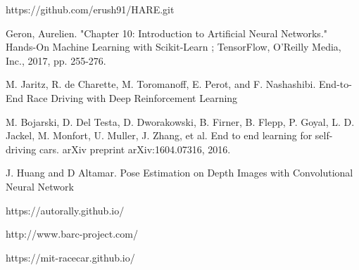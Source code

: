 \documentclass[letterpaper, 10 pt, conference]{ieeeconf}  %
\begin{document}
\begin{thebibliography}{99}
 https://github.com/erush91/HARE.git

 Geron, Aurelien. "Chapter 10: Introduction to Artificial Neural Networks." Hands-On Machine Learning with Scikit-Learn ; TensorFlow, O'Reilly Media, Inc., 2017, pp. 255-276.

 M. Jaritz, R. de Charette, M. Toromanoff, E. Perot, and F. Nashashibi.  End-to-End Race Driving with Deep Reinforcement Learning

 M. Bojarski, D. Del Testa, D. Dworakowski, B. Firner, B. Flepp, P. Goyal, L. D. Jackel, M. Monfort, U. Muller, J. Zhang, et al. End to end learning for self-driving cars. arXiv preprint arXiv:1604.07316, 2016.

 J. Huang and D Altamar. Pose Estimation on Depth Images with Convolutional Neural Network

 https://autorally.github.io/

 http://www.barc-project.com/

 https://mit-racecar.github.io/





\end{thebibliography}
\end{document}
